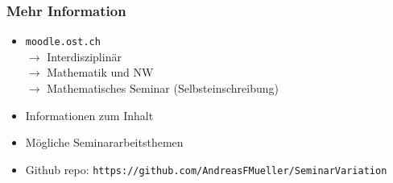 %
%
%
\bgroup
\begin{frame}[t]
\setlength{\abovedisplayskip}{5pt}
\setlength{\belowdisplayskip}{5pt}
\frametitle{Mehr Information}
\begin{itemize}
\item \texttt{moodle.ost.ch}\\
$\rightarrow$ Interdisziplinär\\
$\rightarrow$ Mathematik und NW\\
$\rightarrow$ Mathematisches Seminar
(Selbsteinschreibung)
\item<2-> Informationen zum Inhalt
\item<3-> Mögliche Seminararbeitsthemen
\item<4-> Github repo: \texttt{https://github.com/AndreasFMueller/SeminarVariation}
\end{itemize}
\end{frame}
\egroup
